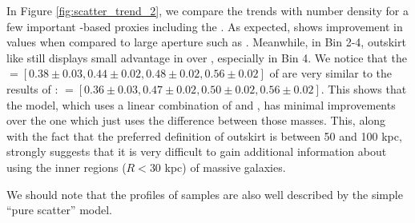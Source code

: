 \documentclass[fleqn,usenatbib,useAMS]{mnras}
\begin{document}
\begin{CJK*}{UTF8}{gbsn}
    In Figure \ref{fig:scatter_trend_2}, we compare the \sigmvir{} trends with number density 
    for a few important \mstar{}-based \mvir{} proxies including the \masap{}. 
    As expected, \masap{} shows improvement in \sigmvir{} values when compared to large aperture 
    \mstar{} such as .
    Meanwhile, in Bin 2-4, outskirt \mstar{} like  still displays small 
    advantage in \sigmvir{} over \masap{}, especially in Bin 4.
    We notice that the \sigmvir{}$=[0.38\pm0.03, 0.44\pm0.02, 0.48\pm0.02, 0.56\pm0.02]$ of \masap{}
    are very similar to the results of : 
    \sigmvir{}$=[0.36\pm0.03, 0.47\pm0.02, 0.50\pm0.02, 0.56\pm0.02]$.
    This shows that the \asap{} model, which uses a linear combination of 
    and , has minimal improvements over the one which just uses the difference between
    those masses. 
    This, along with the fact that the preferred definition of outskirt is between 50 and 100 kpc,
    strongly suggests that it is very difficult to gain additional information about \mvir{} using
    the inner regions ($R < 30$ kpc) of massive galaxies.
    
    We should note that the \dsigma{} profiles of \masap{} samples are also well described
    by the simple ``pure scatter'' model.
    

\end{CJK*}
\end{document}
